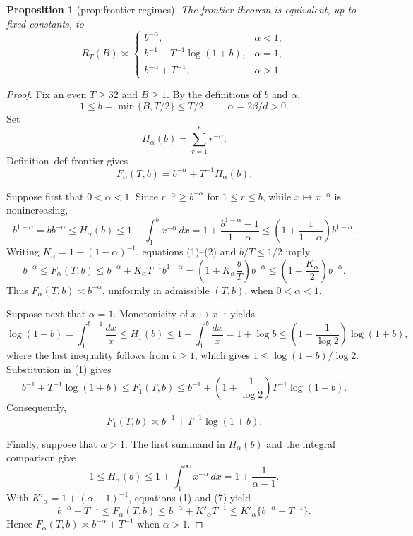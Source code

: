 \documentclass{article}
\newtheorem{proposition}{Proposition}
\begin{document}
\begin{proposition}[prop:frontier-regimes]\label{prop:frontier-regimes}
The frontier theorem is equivalent, up to fixed constants, to \[R_T(B)\asymp\begin{cases}b^{-\alpha},&\alpha<1,\\ b^{-1}+T^{-1}\log(1+b),&\alpha=1,\\ b^{-\alpha}+T^{-1},&\alpha>1.\end{cases}\]
\end{proposition}
\begin{proof}
Fix an even \(T\ge 32\) and \(B\ge 1\).  By the definitions of \(b\) and \(\alpha\),
\[
1\le b=\min\{B,T/2\}\le T/2,
\qquad
\alpha=2\beta/d>0.
\]
Set
\[
H_\alpha(b)=\sum_{r=1}^{b}r^{-\alpha}.
\]
Definition~\(\mathrm{def:frontier}\) gives
\[
F_\alpha(T,b)=b^{-\alpha}+T^{-1}H_\alpha(b). \tag{1}
\]

Suppose first that \(0<\alpha<1\).  Since \(r^{-\alpha}\ge b^{-\alpha}\) for \(1\le r\le b\), while \(x\mapsto x^{-\alpha}\) is nonincreasing,
\[
b^{1-\alpha}=b b^{-\alpha}
\le H_\alpha(b)
\le 1+\int_1^b x^{-\alpha}\,dx
=1+\frac{b^{1-\alpha}-1}{1-\alpha}
\le \left(1+\frac{1}{1-\alpha}\right)b^{1-\alpha}. \tag{2}
\]
Writing \(K_\alpha=1+(1-\alpha)^{-1}\), equations (1)--(2) and \(b/T\le 1/2\) imply
\[
b^{-\alpha}
\le F_\alpha(T,b)
\le b^{-\alpha}+K_\alpha T^{-1}b^{1-\alpha}
=\left(1+K_\alpha\frac bT\right)b^{-\alpha}
\le \left(1+\frac{K_\alpha}{2}\right)b^{-\alpha}. \tag{3}
\]
Thus \(F_\alpha(T,b)\asymp b^{-\alpha}\), uniformly in admissible \((T,b)\), when \(0<\alpha<1\).

Suppose next that \(\alpha=1\).  Monotonicity of \(x\mapsto x^{-1}\) yields
\[
\log(1+b)=\int_1^{b+1}\frac{dx}{x}
\le H_1(b)
\le 1+\int_1^b\frac{dx}{x}
=1+\log b
\le \left(1+\frac{1}{\log 2}\right)\log(1+b), \tag{4}
\]
where the last inequality follows from \(b\ge1\), which gives \(1\le \log(1+b)/\log 2\).  Substitution in (1) gives
\[
b^{-1}+T^{-1}\log(1+b)
\le F_1(T,b)
\le b^{-1}+\left(1+\frac{1}{\log 2}\right)T^{-1}\log(1+b). \tag{5}
\]
Consequently,
\[
F_1(T,b)\asymp b^{-1}+T^{-1}\log(1+b). \tag{6}
\]

Finally, suppose that \(\alpha>1\).  The first summand in \(H_\alpha(b)\) and the integral comparison give
\[
1\le H_\alpha(b)
\le 1+\int_1^\infty x^{-\alpha}\,dx
=1+\frac{1}{\alpha-1}. \tag{7}
\]
With \(K'_\alpha=1+(\alpha-1)^{-1}\), equations (1) and (7) yield
\[
b^{-\alpha}+T^{-1}
\le F_\alpha(T,b)
\le b^{-\alpha}+K'_\alpha T^{-1}
\le K'_\alpha\{b^{-\alpha}+T^{-1}\}. \tag{8}
\]
Hence \(F_\alpha(T,b)\asymp b^{-\alpha}+T^{-1}\) when \(\alpha>1\).


\end{proof}
\end{document}
